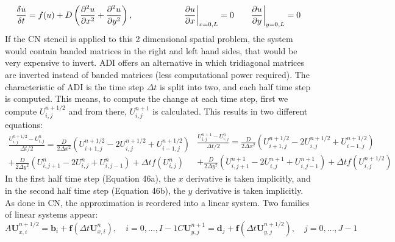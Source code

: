 \begin{equation}
    \frac{\delta u}{\delta t} =  f(u) + D\left(\pdv[2]{u}{x} + \pdv[2]{u}{y}\right) ,   \quad \quad \quad \quad \quad \quad \pdv{u}{x}\biggr\rvert_{x=0,L}=0 \quad \quad \pdv{u}{y}\biggr\rvert_{y=0,L}=0
\end{equation}
If the CN stencil is applied to this 2 dimensional spatial problem, the system would contain banded matrices in the right and left hand sides, that would be very expensive to invert. ADI offers an alternative in which tridiagonal matrices are inverted instead of banded matrices (less computational power required). The characteristic of ADI is the time step $\Delta t$ is split into two, and each half time step is computed. This means, to compute the change at each time step, first we compute $U^{n+1/2}_{i,j} $ and from there,    $U^{n+1}_{i,j} $ is calculated. This results in two different equations:
\begin{subequations}
    \begin{equation}
        \begin{split}
            \frac{U^{n+1/2}_{i,j} - U^{n}_{i,j} }{\Delta t/2} = \frac{D}{2\Delta x^{2}}\left( U^{n+1/2}_{i+1,j} -  2U^{n+1/2}_{i,j} + U^{n+1/2}_{i-1,j}\right)  \\+ \frac{D}{2\Delta y^{2}}\left( U^{n}_{i,j+1} -  2U^{n}_{i,j} + U^{n}_{i,j-1}\right)  + \Delta t f(U^{n}_{i,j})
        \end{split}
    \end{equation}
    \begin{equation}
        \begin{split}
            \frac{U^{n+1}_{i,j} - U^{n}_{i,j} }{\Delta t/2} = \frac{D}{2\Delta x^{2}}\left( U^{n+1/2}_{i+1,j} -  2U^{n+1/2}_{i,j} + U^{n+1/2}_{i-1,j}\right)  \\+ \frac{D}{2\Delta y^{2}}\left( U^{n+1}_{i,j+1} -  2U^{n+1}_{i,j} + U^{n+1}_{i,j-1}\right)  + \Delta t f(U^{n+1/2}_{i,j})
        \end{split}
    \end{equation}
\end{subequations}
In the first half time step (Equation 46a), the $x$ derivative is taken implicitly, and in the second half time step (Equation 46b), the $y$ derivative is taken implicitly. As done in CN, the approximation is reordered into a linear system. Two families of linear systems appear:
\begin{subequations}
    \begin{equation}
        A\textbf{U}^{n+1/2}_{x,i} = \textbf{b}_{i} + \textbf{f}(\Delta t \textbf{U}^{n}_{x,i}), \quad i=0,...,I-1
    \end{equation}
    \begin{equation}
        C\textbf{U}^{n+1}_{y,j} = \textbf{d}_{j} + \textbf{f}(\Delta t \textbf{U}^{n+1/2}_{y,j}), \quad j=0,...,J-1
    \end{equation}
\end{subequations}

